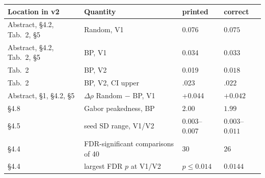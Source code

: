 \begin{tabular}{llll}
\toprule
Location in v2 & Quantity & printed & correct \\
\midrule
Abstract, \S4.2, Tab.~2, \S5 & Random, V1 & 0.076 & $0.075$ \\
Abstract, \S4.2, Tab.~2, \S5 & BP, V1 & 0.034 & $0.033$ \\
Tab.~2 & BP, V2 & 0.019 & $0.018$ \\
Tab.~2 & BP, V2, CI upper & .023 & $.022$ \\
Abstract, \S1, \S4.2, \S5 & $\Delta\rho$ Random $-$ BP, V1 & +0.044 & $+0.042$ \\
\S4.8 & Gabor peakedness, BP & 2.00 & $1.99$ \\
\S4.5 & seed SD range, V1/V2 & 0.003--0.007 & $0.003$--$0.011$ \\
\S4.4 & FDR-significant comparisons of 40 & 30 & $26$ \\
\S4.4 & largest FDR $p$ at V1/V2 & $p \le 0.014$ & $0.0144$ \\
\bottomrule
\end{tabular}
